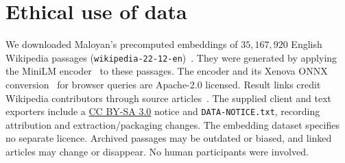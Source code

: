 \documentclass[sigconf, screen, review, balance=false]{acmart}
\begin{document}
\section{Ethical use of data}
We downloaded Maloyan's precomputed embeddings of $35{,}167{,}920$ English Wikipedia passages (\nolinkurl{wikipedia-22-12-en})~\cite{wiki-minilm}. They were generated by applying the MiniLM encoder~\cite{minilm-model-card} to these passages. The encoder and its Xenova ONNX conversion~\cite{xenova-model-card} for browser queries are Apache-2.0 licensed. Result links credit Wikipedia contributors through source articles~\cite{wikipedia-copyrights}. The supplied client and text exporters include a \href{https://creativecommons.org/licenses/by-sa/3.0/}{CC BY-SA 3.0} notice and \texttt{DATA-NOTICE.txt}, recording attribution and extraction/packaging changes. The embedding dataset specifies no separate licence. Archived passages may be outdated or biased, and linked articles may change or disappear. No human participants were involved.



\end{document}
